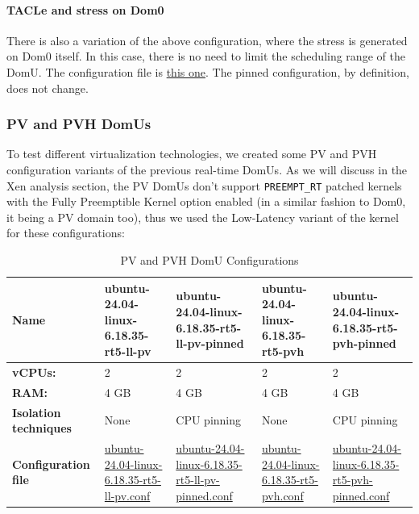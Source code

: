 \begin{Shaded}
\begin{Highlighting}[]
\end{Highlighting}
\end{Shaded}

\paragraph{TACLe and stress on Dom0}\label{tacle-and-stress-on-dom0}

There is also a variation of the above configuration, where the stress
is generated on Dom0 itself. In this case, there is no need to limit the
scheduling range of the DomU. The configuration file is
\href{Xen/domains/ubuntu-24.04-linux-6.18.35-rt5-hvm-tacle-dom0noise.conf}{this
one}. The pinned configuration, by definition, does not change.

\subsubsection{PV and PVH DomUs}\label{pv-and-pvh-domus}

To test different virtualization technologies, we created some PV and
PVH configuration variants of the previous real-time DomUs. As we will
discuss in the Xen analysis section, the PV DomUs don't support
\texttt{PREEMPT\_RT} patched kernels with the Fully Preemptible Kernel
option enabled (in a similar fashion to Dom0, it being a PV domain too),
thus we used the Low-Latency variant of the kernel for these
configurations:

\begin{table}
\centering
\caption{PV and PVH DomU Configurations}
\label{tab:setup:xen-pvh}
\begin{tabularx}{\linewidth}{@{}YYYYY@{}}
\toprule
Name & ubuntu-24.04-linux-6.18.35-rt5-ll-pv & ubuntu-24.04-linux-6.18.35-rt5-ll-pv-pinned & ubuntu-24.04-linux-6.18.35-rt5-pvh & ubuntu-24.04-linux-6.18.35-rt5-pvh-pinned\tabularnewline
\midrule
\textbf{vCPUs:} & 2 & 2 & 2 & 2\tabularnewline
\textbf{RAM:} & 4 GB & 4 GB & 4 GB & 4 GB\tabularnewline
\textbf{Isolation techniques} & None & CPU pinning & None & CPU pinning\tabularnewline
\textbf{Configuration file} & \href{Xen/domains/ubuntu-24.04-linux-6.18.35-rt5-ll-pv.conf}{ubuntu-24.04-linux-6.18.35-rt5-ll-pv.conf} & \href{Xen/domains/ubuntu-24.04-linux-6.18.35-rt5-ll-pv-pinned.conf}{ubuntu-24.04-linux-6.18.35-rt5-ll-pv-pinned.conf} & \href{Xen/domains/ubuntu-24.04-linux-6.18.35-rt5-pvh.conf}{ubuntu-24.04-linux-6.18.35-rt5-pvh.conf} & \href{Xen/domains/ubuntu-24.04-linux-6.18.35-rt5-pvh-pinned.conf}{ubuntu-24.04-linux-6.18.35-rt5-pvh-pinned.conf}\tabularnewline
\bottomrule
\end{tabularx}
\end{table}

